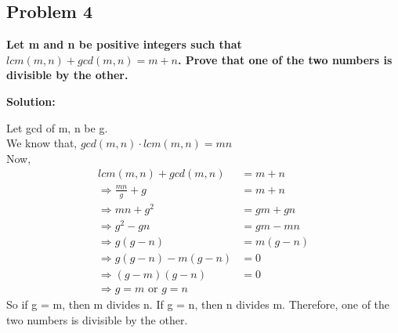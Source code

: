 \subsection{Problem 4}
\textbf{Let m and n be positive integers such that $ lcm(m, n) + gcd(m, n) = m + n $. Prove that one of the two
numbers is divisible by the other.}
\par

\begin{flushleft}
\textbf{Solution: }
\par
Let gcd of m, n be g.\\
We know that, $ gcd(m, n) \cdot lcm(m, n) = mn$ \\
Now, 
$$
\begin{aligned}
    lcm(m, n) + gcd(m, n) & = m + n \\
    \Rightarrow \frac{mn}{g} + g & = m + n \\
    \Rightarrow mn + g^2 & = gm + gn \\
    \Rightarrow g^2 - gn & = gm - mn \\
    \Rightarrow g(g - n) & = m(g - n) \\
    \Rightarrow g(g-n) - m(g-n) & = 0 \\
    \Rightarrow (g-m)(g-n) & = 0 \\
    \Rightarrow g = m \text{ or } g = n 
\end{aligned}
$$
So if g = m, then m divides n. If g = n, then n divides m.
Therefore, one of the two numbers is divisible by the other.
\end{flushleft}
